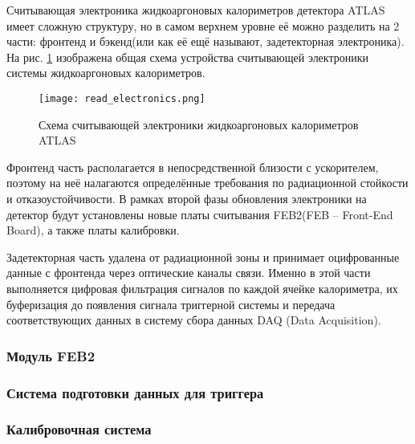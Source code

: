 Считывающая электроника жидкоаргоновых калориметров детектора ATLAS имеет сложную структуру, но в самом верхнем уровне её можно разделить на 2 части: фронтенд и бэкенд(или как её ещё называют, задетекторная электроника). На рис. \ref{fig:read_electronics} изображена общая схема устройства считывающей электроники системы жидкоаргоновых калориметров.
\begin{figure}[ht]
    \centering
    \texttt{[image: read\_electronics.png]}
    \caption{Схема считывающей электроники жидкоаргоновых калориметров ATLAS}
    \label{fig:read_electronics}
\end{figure}\par
Фронтенд часть располагается в непосредственной близости с ускорителем, поэтому на неё налагаются определённые требования по радиационной стойкости и отказоустойчивости. В рамках второй фазы обновления электроники на детектор будут установлены новые платы считывания FEB2(FEB -- Front-End Board), а также платы калибровки.\par
Задетекторная часть удалена от радиационной зоны и принимает оцифрованные данные с фронтенда через оптические каналы связи. Именно в этой части выполняется цифровая фильтрация сигналов по каждой ячейке калориметра, их буферизация до появления сигнала триггерной системы и передача соответствующих данных в систему сбора данных DAQ (Data Acquisition).\par

\subsubsection{Модуль FEB2}


\subsubsection{Система подготовки данных для триггера}


\subsubsection{Калибровочная система}


